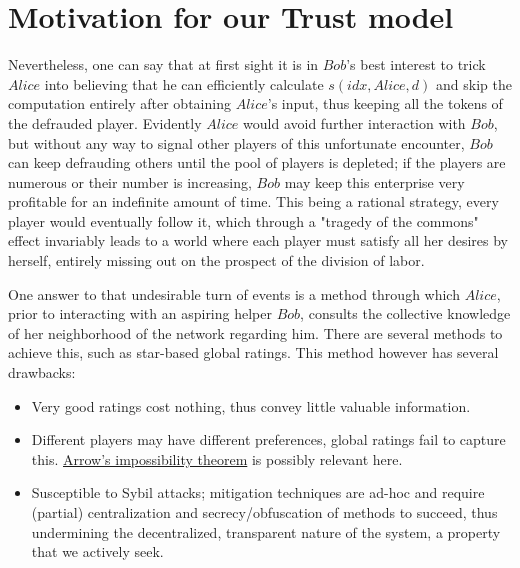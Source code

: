\section{Motivation for our Trust model}
  Nevertheless, one can say that at first sight it is in $Bob$'s best interest to trick $Alice$ into believing that he can
  efficiently calculate $s\left(idx, Alice, d\right)$ and skip the computation entirely after obtaining $Alice$'s input,
  thus keeping all the tokens of the defrauded player. Evidently $Alice$ would avoid further interaction with $Bob$, but
  without any way to signal other players of this unfortunate encounter, $Bob$ can keep defrauding others until the pool of
  players is depleted; if the players are numerous or their number is increasing, $Bob$ may keep this enterprise very
  profitable for an indefinite amount of time. This being a rational strategy, every player would eventually follow it, which
  through a "tragedy of the commons" effect invariably leads to a world where each player must satisfy all her desires by
  herself, entirely missing out on the prospect of the division of labor.

  One answer to that undesirable turn of events is a method through which $Alice$, prior to interacting with an aspiring
  helper $Bob$, consults the collective knowledge of her neighborhood of the network regarding him. There are several
  methods to achieve this, such as star-based global ratings. This method however has several drawbacks:

  \begin{itemize}
    \item Very good ratings cost nothing, thus convey little valuable information.
    \item Different players may have different preferences, global ratings fail to capture this.
    \href{https://en.wikipedia.org/wiki/Arrow\%27s_impossibility_theorem}{Arrow's impossibility theorem} is possibly relevant
    here.
    \item Susceptible to Sybil attacks; mitigation techniques are ad-hoc and require (partial) centralization and
    secrecy/obfuscation of methods to succeed, thus undermining the decentralized, transparent nature of the system, a
    property that we actively seek.
  \end{itemize}
